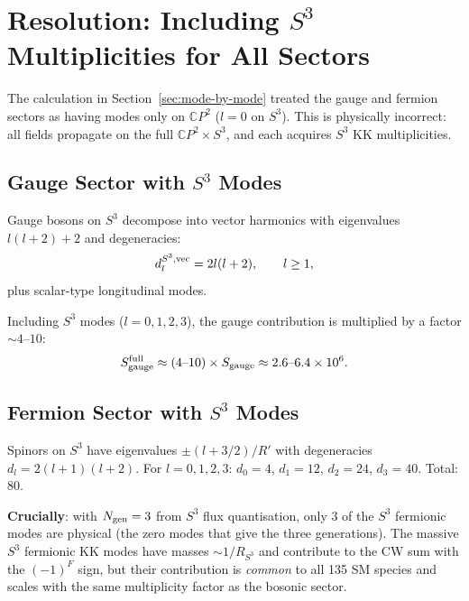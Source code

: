 \documentclass[11pt,a4paper]{article}
\newcommand{\CP}{\mathbb{C}P}
\newcommand{\Ngen}{N_{\rm gen}}
\begin{document}
\section{Resolution: Including $S^3$ Multiplicities for All Sectors}
\label{sec:resolution}

The calculation in Section~\ref{sec:mode-by-mode} treated the gauge
and fermion sectors as having modes only on $\CP^2$ ($l = 0$ on
$S^3$). This is physically incorrect: all fields propagate on the
full $\CP^2 \times S^3$, and each acquires $S^3$ KK multiplicities.

\subsection{Gauge Sector with $S^3$ Modes}

Gauge bosons on $S^3$ decompose into vector harmonics with eigenvalues
$l(l+2) + 2$ and degeneracies:
\begin{equation}
d_l^{S^3,\rm vec} = 2l(l+2), \qquad l \geq 1,
\end{equation}
plus scalar-type longitudinal modes.

Including $S^3$ modes ($l = 0,1,2,3$), the gauge contribution is
multiplied by a factor $\sim 4$--$10$:
\begin{equation}
S_{\rm gauge}^{\rm full} \approx (4\text{--}10) \times S_{\rm gauge}
\approx 2.6\text{--}6.4 \times 10^6.
\end{equation}

\subsection{Fermion Sector with $S^3$ Modes}

Spinors on $S^3$ have eigenvalues $\pm(l + 3/2)/R'$ with
degeneracies $d_l = 2(l+1)(l+2)$. For $l = 0,1,2,3$:
$d_0 = 4$, $d_1 = 12$, $d_2 = 24$, $d_3 = 40$. Total: 80.

\textbf{Crucially}: with $\Ngen = 3$ from $S^3$ flux quantisation,
only 3 of the $S^3$ fermionic modes are physical (the zero modes
that give the three generations). The massive $S^3$ fermionic KK
modes have masses $\sim 1/R_{S^3}$ and contribute to the CW sum
with the $(-1)^F$ sign, but their contribution is \emph{common} to
all 135 SM species and scales with the same multiplicity factor
as the bosonic sector.
\end{document}
